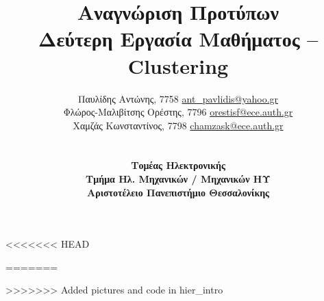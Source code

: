 

\usepackage{polyglossia}
\setmainlanguage{greek}

\usepackage{fontspec}
\setmainfont[Mapping=tex-text]{DejaVu Sans}
\newfontfamily{}
\newfontfamily{}
\usepackage{microtype} %

\title{Αναγνώριση Προτύπων\\
Δεύτερη Εργασία Μαθήματος – Clustering}
\author{
  Παυλίδης Αντώνης, 7758 \href{mailto:ant\_pavlidis@yahoo.gr}{ant\_pavlidis@yahoo.gr}\\
  Φλώρος-Μαλιβίτσης Ορέστης, 7796 \href{mailto:orestisf@ece.auth.gr}{orestisf@ece.auth.gr}\\
  Χαμζάς Κωνσταντίνος, 7798 \href{mailto:chamzask@ece.auth.gr}{chamzask@ece.auth.gr}\\
  \\\\ \textbf{Τομέας Ηλεκτρονικής}\\
  \textbf{Τμήμα Ηλ. Μηχανικών / Μηχανικών ΗΥ}\\
  \textbf{Αριστοτέλειο Πανεπιστήμιο Θεσσαλονίκης}}

\maketitle
\tableofcontents
\listoffigures
\listoftables


<<<<<<< HEAD

=======

>>>>>>> Added pictures and code in hier_intro

